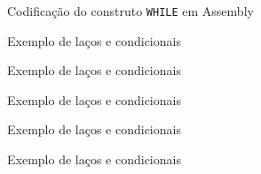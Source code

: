 \begin{frame}[fragile]{Codificação do construto {\tt WHILE} em Assembly}
\end{frame}

\begin{frame}[fragile]{Exemplo de laços e condicionais}
\end{frame}

\begin{frame}[fragile]{Exemplo de laços e condicionais}
\end{frame}

\begin{frame}[fragile]{Exemplo de laços e condicionais}
\end{frame}

\begin{frame}[fragile]{Exemplo de laços e condicionais}
\end{frame}
\begin{frame}[fragile]{Exemplo de laços e condicionais}
\end{frame}
